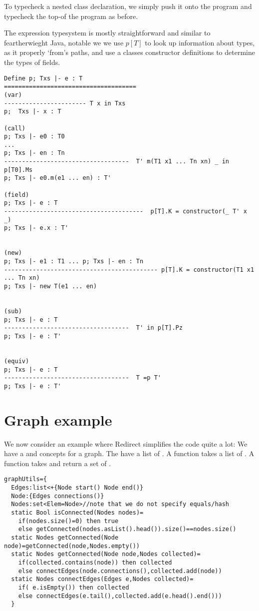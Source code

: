 To typecheck a nested class declaration, we simply push it onto the program and typecheck the top-of the program as before.


The expression typesystem is mostly straightforward and similar to feartherwieght Java, notable we we use $p[T]$ to look up information about types, as it properly ‘from’s paths, and use a classes constructor definitions to determine the types of fields.

\begin{verbatim}
Define p; Txs |- e : T
=====================================
(var)
----------------------- T x in Txs
p;  Txs |- x : T

(call)
p; Txs |- e0 : T0
...
p; Txs |- en : Tn
-----------------------------------  T' m(T1 x1 ... Tn xn) _ in p[T0].Ms
p; Txs |- e0.m(e1 ... en) : T'

(field)
p; Txs |- e : T
---------------------------------------  p[T].K = constructor(_ T' x _)
p; Txs |- e.x : T'


(new)
p; Txs |- e1 : T1 ... p; Txs |- en : Tn
------------------------------------------- p[T].K = constructor(T1 x1 ... Tn xn)
p; Txs |- new T(e1 ... en)


(sub)
p; Txs |- e : T
-----------------------------------  T' in p[T].Pz
p; Txs |- e : T'


(equiv)
p; Txs |- e : T
-----------------------------------  T =p T'
p; Txs |- e : T'
\end{verbatim}

\section{Graph example}
We now consider an example where Redirect simplifies the code quite a lot:
We have a \Q@Node@ and \Q@Edge@ concepts for a graph.
The \Q@Node@ have a list of \Q@Edge@s.
A \Q@isConnected@ function takes a list of \Q@Node@s.
A \Q@getConnected@ function takes \Q@Node@ and return a set of \Q@Node@s.
\begin{lstlisting}
graphUtils={
  Edges:list<+{Node start() Node end()}
  Node:{Edges connections()}
  Nodes:set<Elem=Node>//note that we do not specify equals/hash
  static Bool isConnected(Nodes nodes)=
    if(nodes.size()=0) then true
    else getConnected(nodes.asList().head()).size()==nodes.size()
  static Nodes getConnected(Node node)=getConnected(node,Nodes.empty())
  static Nodes getConnected(Node node,Nodes collected)=
    if(collected.contains(node)) then collected
    else connectEdges(node.connections(),collected.add(node))
  static Nodes connectEdges(Edges e,Nodes collected)=
    if( e.isEmpty()) then collected
    else connectEdges(e.tail(),collected.add(e.head().end()))
  }
\end{lstlisting}

